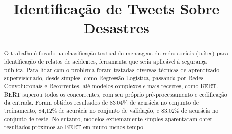 \documentclass[twoside,conference,a4paper]{IEEEtran}
\begin{document}
\renewcommand{\IEEEkeywordsname}{Palavras-chave}


\title{Identificação de Tweets Sobre Desastres}
\author{%
 \and
 \and
}


\maketitle

\begin{abstract}
 
 O trabalho é focado na classificação textual de mensagens de redes sociais (tuítes) para identificação de relatos de acidentes, ferramenta que seria aplicável à segurança pública. Para lidar com o problema foram testadas diversas técnicas de aprendizado supervisionado, desde simples, como Regressão Logística, passando por Redes Convolucionais e Recorrentes, até modelos complexos e mais recentes, como BERT. BERT superou todos os concorrentes, com seu próprio pré-processamento e codificação da entrada. Foram obtidos resultados de 83,04\% de acurácia no conjunto de treinamento, 84,12\% de acurácia no conjunto de validação, e 83,02\% de acurácia no conjunto de teste. No entanto, modelos extremamente simples aparentaram obter resultados próximos ao BERT em muito menos tempo. 
 
 
\end{abstract}
\end{document}
